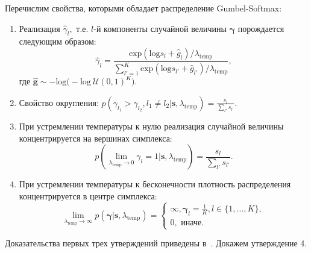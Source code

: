 Перечислим свойства, которыми обладает распределение Gumbel-Softmax:
\begin{enumerate}
\item Реализация $\hat{\gamma}_l,$ т.е. $l$-й компоненты случайной величины $\boldsymbol{\gamma}$ порождается следующим образом:
\[
    \hat{\gamma}_l = \frac{\text{exp}(\text{log}s_l+\hat{g}_l)/\lambda_{\text{temp}}}{\sum_{l'=1}^{K}\text{exp}(\text{log}s_{l'}+\hat{g}_{l'})/\lambda_{\text{temp}}},
\]
где $\hat{\mathbf{g}} \sim -\text{log}\bigl(-\text{log}~\mathcal{U}(0,1)^K\bigr).$ 

\item Свойство округления: $p(\gamma_{l_1} > \gamma_{l_2}, l_1\neq l_2|\mathbf{s}, {\lambda}_\text{temp}) = \frac{s_l}{\sum_{l'}s_{l'}}.$

\item При устремлении температуры к нулю реализация случайной величины концентрируется на вершинах симплекса:
\[
    p(\lim_{\lambda_{\text{temp}} \to 0}  \gamma_{l} = 1|\mathbf{s}, {\lambda}_\text{temp})  = \frac{s_l}{\sum_{l'}s_{l'}}.
\]


\item При устремлении температуры к бесконечности плотность распределения концентрируется в центре симплекса:
\begin{equation}
\label{eq:theorem_gs}
    \lim_{\lambda_{\text{temp}} \to \infty}  p(\boldsymbol{\gamma}|\mathbf{s}, {\lambda}_\text{temp}) = 
    \begin{cases}
    \infty, \boldsymbol{\gamma}_l = \frac{1}{K}, l \in \{1,\dots,K\},\\
    0, \text{ иначе.}
    \end{cases}
\end{equation}
\end{enumerate}

Доказательства первых трех утверждений приведены в~\cite{gumbel}. Докажем утверждение 4.

